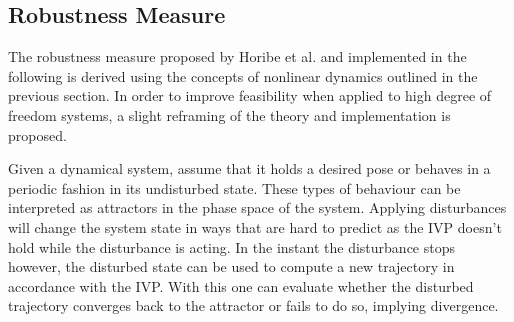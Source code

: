 




     
     

    

    

\subsection{Robustness Measure} \label{robustnessmeasure}

    The robustness measure proposed by Horibe et al. \cite{quant} and implemented in the following is derived using the concepts of nonlinear dynamics outlined in the previous section. In order to improve feasibility when applied to high degree of freedom systems, a slight reframing of the theory and implementation is proposed.
    
    Given a dynamical system, assume that it holds a desired pose or behaves in a periodic fashion in its undisturbed state. These types of behaviour can be interpreted as attractors in the phase space of the system. Applying disturbances will change the system state in ways that are hard to predict as the IVP doesn't hold while the disturbance is acting. In the instant the disturbance stops however, the disturbed state can be used to compute a new trajectory in accordance with the IVP. With this one can evaluate whether the disturbed trajectory converges back to the attractor or fails to do so, implying divergence. %

